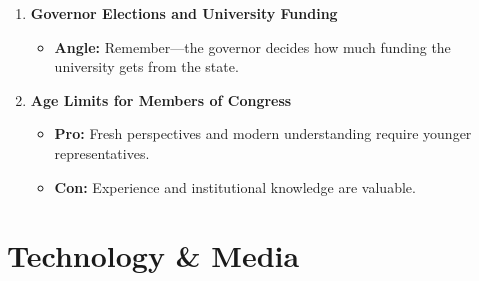 \documentclass{article}
\begin{document}
\begin{enumerate}[leftmargin=*]
    \item \textbf{Governor Elections and University Funding}
    \begin{itemize}
        \item \textbf{Angle:} Remember---the governor decides how much funding the university gets from the state.
    \end{itemize}

    \item \textbf{Age Limits for Members of Congress}
    \begin{itemize}
        \item \textbf{Pro:} Fresh perspectives and modern understanding require younger representatives.
        \item \textbf{Con:} Experience and institutional knowledge are valuable.
    \end{itemize}
\end{enumerate}

\section*{Technology \& Media}
\end{document}
